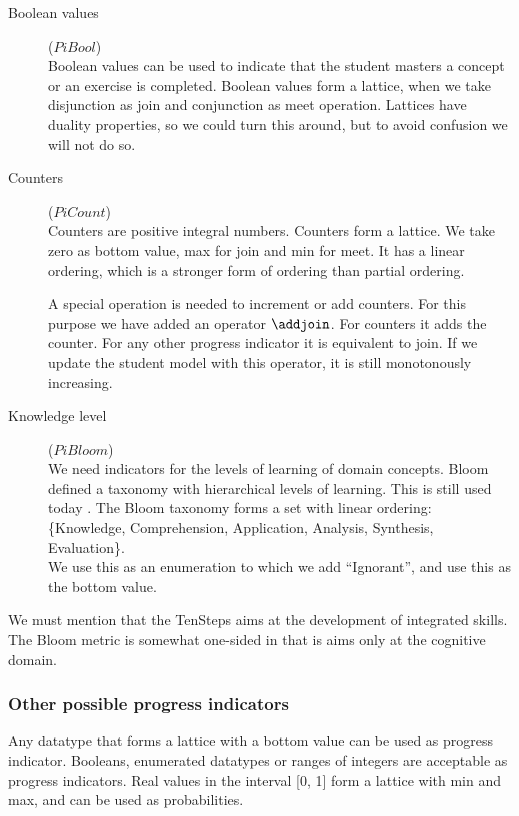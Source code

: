 \begin{description}
\item [Boolean values] ($PiBool$)\hfill \\
Boolean values can be used to indicate that the student masters a concept or an exercise is completed.
Boolean values form a lattice, when we take disjunction as join and conjunction as meet operation.
Lattices have duality properties, so we could turn this around, but to avoid confusion we will not do so.
\item[Counters]  ($PiCount$) \hfill \\
Counters are positive integral numbers. Counters form a lattice. We take zero as bottom value, max for join and min for meet.
It has a linear ordering, which is a stronger form of ordering than partial ordering.

A special operation is needed to increment or add counters. 
For this purpose we have added an operator $\addjoin$. 
For counters it adds the counter. For any other progress indicator it is equivalent to join.
If we update the student model with this operator, it is still monotonously increasing.


\item[Knowledge level] ($PiBloom$)  \hfill \\
We need indicators for the levels of learning of domain concepts.
Bloom defined a taxonomy with hierarchical levels of learning. This is still used today \citep{BHALERAO201756}.
The Bloom taxonomy forms  a set with  linear ordering:\\
\{Knowledge, Comprehension, Application, Analysis, Synthesis, Evaluation\}.\\
We use this as an enumeration to which we add ``Ignorant'', and use this as the bottom value. 

\end{description}

We must mention that the TenSteps aims at the development of integrated skills.
The Bloom metric is somewhat one-sided in that is aims only at the cognitive domain.  

\subsubsection{Other possible progress indicators}
\label{sec:atomicpi}

Any datatype that forms a lattice with a bottom value can be used as progress indicator.
Booleans, enumerated datatypes or ranges of integers are acceptable as progress indicators.
Real values in the interval [0, 1] form a lattice with min and max, and can be used as probabilities.

